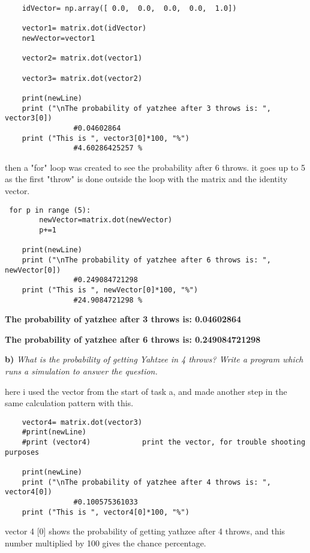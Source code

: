 \documentclass{article}
\begin{document}
\begin{verbatim}
    idVector= np.array([ 0.0,  0.0,  0.0,  0.0,  1.0]) 
    
    vector1= matrix.dot(idVector)
    newVector=vector1
    
    vector2= matrix.dot(vector1)
    
    vector3= matrix.dot(vector2)
    
    print(newLine)
    print ("\nThe probability of yatzhee after 3 throws is: ", vector3[0])
                #0.04602864
    print ("This is ", vector3[0]*100, "%")             
                #4.60286425257 %
\end{verbatim}

then a "for" loop was created to see the probability after 6 throws. it goes up to 5 as the first "throw" is done outside the loop with the matrix and the identity vector.

\begin{verbatim}
 for p in range (5):
        newVector=matrix.dot(newVector)
        p+=1

    print(newLine)
    print ("\nThe probability of yatzhee after 6 throws is: ", newVector[0])           
                #0.249084721298
    print ("This is ", newVector[0]*100, "%")   
                #24.9084721298 %
\end{verbatim}

\textbf{The probability of yatzhee after 3 throws is: 0.04602864}

\textbf{The probability of yatzhee after 6 throws is: 0.249084721298}
\vspace{10pt}

\textbf{b)}
\textit{What is the probability of getting Yahtzee in 4 throws? Write a
program which runs a simulation to answer the question.}
\vspace{10pt}

here i used the vector from the start of task a, and made another step in the same calculation pattern with this.

\begin{verbatim}
    vector4= matrix.dot(vector3)
    #print(newLine)
    #print (vector4)            print the vector, for trouble shooting purposes

    print(newLine)
    print ("\nThe probability of yatzhee after 4 throws is: ", vector4[0])   
                #0.100575361033
    print ("This is ", vector4[0]*100, "%")    
\end{verbatim}

vector 4 [0] shows the probability of getting yathzee after 4 throws, and this number multiplied by 100 gives the chance percentage.
\end{document}
